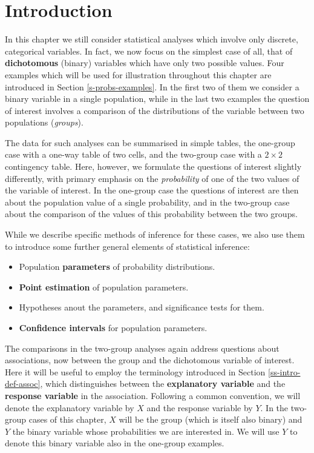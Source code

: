 \documentclass[11pt,a4paper,openany]{book}
\begin{document}
\section{Introduction}\label{s-probs-intro}

In this chapter we still consider statistical analyses which involve
only discrete, categorical variables. In fact, we now focus on the
simplest case of all, that of \textbf{dichotomous} (binary) variables
which have only two possible values. Four examples which will be used
for illustration throughout this chapter are introduced in Section
\ref{s-probs-examples}. In the first two of them we consider a binary
variable in a single population, while in the last two examples the
question of interest involves a comparison of the distributions of the
variable between two populations (\emph{groups}).

The data for such analyses can be summarised in simple tables, the
one-group case with a one-way table of two cells, and the two-group case
with a \(2\times 2\) contingency table. Here, however, we formulate the
questions of interest slightly differently, with primary emphasis on the
\emph{probability} of one of the two values of the variable of interest.
In the one-group case the questions of interest are then about the
population value of a single probability, and in the two-group case
about the comparison of the values of this probability between the two
groups.

While we describe specific methods of inference for these cases, we also
use them to introduce some further general elements of statistical
inference:

\begin{itemize}
\item
  Population \textbf{parameters} of probability distributions.
\item
  \textbf{Point estimation} of population parameters.
\item
  Hypotheses anout the parameters, and significance tests for them.
\item
  \textbf{Confidence intervals} for population parameters.
\end{itemize}

The comparisons in the two-group analyses again address questions about
associations, now between the group and the dichotomous variable of
interest. Here it will be useful to employ the terminology introduced in
Section \ref{ss-intro-def-assoc}, which distinguishes between the
\textbf{explanatory variable} and the \textbf{response variable} in the
association. Following a common convention, we will denote the
explanatory variable by \(X\) and the response variable by \(Y\). In the
two-group cases of this chapter, \(X\) will be the group (which is
itself also binary) and \(Y\) the binary variable whose probabilities we
are interested in. We will use \(Y\) to denote this binary variable also
in the one-group examples.
\end{document}
